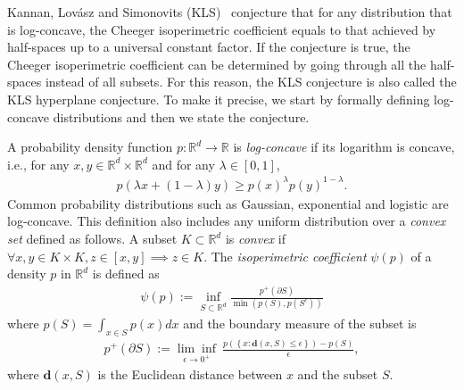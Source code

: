 \documentclass[11pt,twoside]{article}
\newcommand{\isoperi}{\psi}
\newcommand{\defn}{:=}
\theoremstyle{named}
\theoremstyle{plain}
\newcommand{\usedim}{\ensuremath{d}}
\newcommand{\dims}{\usedim}
\newcommand{\real}{\ensuremath{\mathbb{R}}}
\newcommand{\parenth}[1]{\left( #1 \right)}
\newcommand{\braces}[1]{\left\{ #1 \right \}}
\begin{document}
Kannan, Lov\'asz and Simonovits (KLS)~\cite{kannan1995isoperimetric} conjecture that for any distribution that is log-concave, the Cheeger isoperimetric coefficient equals to that achieved by half-spaces up to a universal constant factor. If the conjecture is true, the Cheeger isoperimetric coefficient can be determined by going through all the half-spaces instead of all subsets. For this reason, the KLS conjecture is also called the KLS hyperplane conjecture. To make it precise, we start by formally defining log-concave distributions and then we state the conjecture.

A probability density function $p: \real^\dims \rightarrow \real$ is \textit{log-concave} if its logarithm is concave, i.e., for any $x, y \in \real^{\dims} \times \real^{\dims}$ and for any $\lambda \in [0, 1]$,
\begin{align}
  \label{eq:def_logconcave}
  p(\lambda x + (1 - \lambda) y) \geq p(x)^\lambda p(y)^{1-\lambda}.
\end{align}
Common probability distributions such as Gaussian, exponential and logistic are log-concave. This definition also includes any uniform distribution over a \textit{convex set} defined as follows. A subset $K \subset \real^\dims$ is \textit{convex} if $\forall x, y \in K \times K, z \in [x, y] \implies z \in K$.
The \textit{isoperimetric coefficient} $\isoperi(p)$ of a density $p$ in $\real^\dims$ is defined as
\begin{align}
  \label{eq:def_isoperi}
  \isoperi(p) \defn \inf_{S \subset \real^\dims }\frac{p^+(\partial S)}{\min(p(S), p(S^c))}
\end{align}
where $p(S) = \int_{x \in S} p(x) dx$ and the boundary measure of the subset is
\begin{align*}
  p^+(\partial S) \defn \underset{\epsilon \rightarrow 0^+}{\lim\inf}\ \frac{p\parenth{\braces{x: \mathbf{d}(x, S) \leq \epsilon}} - p(S)}{\epsilon},
\end{align*}
where $\mathbf{d}(x, S)$ is the Euclidean distance between $x$ and the subset $S$.
\end{document}
